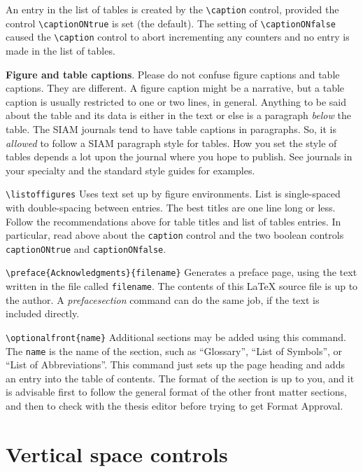 \begin{description}
An entry in the list of tables is created by the \verb"\caption"
control, provided the control \verb"\captionONtrue" is set (the
default). The setting of \verb"\captionONfalse" caused the
\verb"\caption" control to abort incrementing any counters and no entry
is made in the list of tables.


{\bf Figure and table captions}.
Please do not confuse figure captions and table captions. They are
different. A figure caption might be a narrative, but a table caption is
usually restricted to one or two lines, in general. Anything to be said
about the table and its data is either in the text or else is a
paragraph {\em below} the table. The SIAM journals tend to have table
captions in paragraphs.  So, it is {\em allowed} to follow a SIAM
paragraph style for tables. How you set the style of tables depends a
lot upon the journal where you hope to publish. See journals in your
specialty and the standard style guides for examples.

\item \verb|\listoffigures|
Uses text set up by figure environments.
List is single-spaced with double-spacing
between entries. The best titles are one line long or less. Follow the
recommendations above for table titles and list of tables entries.
In particular, read above about the {\tt caption} control and the two
boolean controls {\tt captionONtrue} and {\tt captionONfalse}.

\item \verb|\preface{Acknowledgments}{filename}|
Generates a preface page, using the text written in the file called
\verb|filename|. The contents of this \LaTeX{} source file is up to the
author. A {\em prefacesection} command can do the same job, if the
text is included directly.

\item  \verb|\optionalfront{name}|
Additional sections may be added using this command.  The \verb|name| is
the name of the section, such as ``Glossary'', ``List of Symbols'', or
``List of Abbreviations''. This command just sets up the page heading
and adds an entry into the table of contents.  The format of the section
is up to you, and it is advisable first to follow the general format of
the other front matter sections, and then to check with the thesis
editor before trying to get Format Approval.

\end{description}

\section{Vertical space controls}

